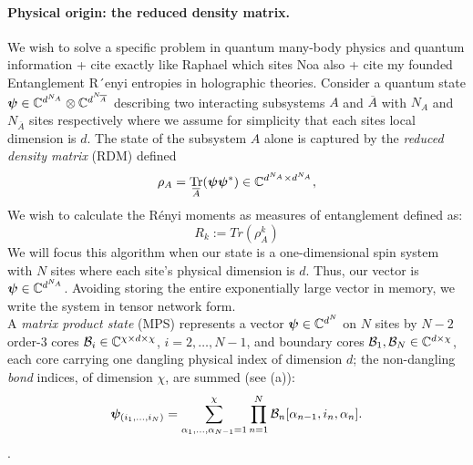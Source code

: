 \documentclass[11pt]{article}
\theoremstyle{plain}
\theoremstyle{definition}
\theoremstyle{remark}
\begin{document}
\paragraph{Physical origin: the reduced density matrix.}
We wish to solve a specific problem in quantum many-body physics and quantum information \cite{vidal2003,schollwock2011,oseledets2011tt}  {\color{red} + cite exactly like Raphael which sites Noa also + cite my founded Entanglement R´enyi entropies in holographic theories.}
Consider a quantum state $\mathbf{\boldsymbol{\psi}}\in\mathbb{C}^{d^{N_A}}\otimes\mathbb{C}^{d^{N_{\overline{A}}}}$ describing
two interacting subsystems $A$  and $\overline{A}$ with $N_A$  and $N_{\overline{A}}$  sites respectively where we assume for simplicity that each sites local dimension is $d$. 
The state of the subsystem $A$ alone is captured by the \emph{reduced density matrix} (RDM) defined
\[
  \rho_A=\mathop{\mathrm{Tr}}_{\overline{A}}(\mathbf{\boldsymbol{\psi}}\mathbf{\boldsymbol{\psi}}^{*})\in\mathbb{C}^{d^{N_A}\times d^{N_A}},
\]
We wish to calculate the R\'enyi moments as measures of entanglement defined as:
\begin{equation}
    R_k:=Tr(\rho_A^k)
\end{equation}
We will focus this algorithm when our state is a one-dimensional spin system with $N$  sites where each site's physical dimension is $d$. Thus, our vector is $\mathbf{\boldsymbol{\psi}}\in\mathbb{C}^{d^{N_A}}$. Avoiding storing the entire exponentially large vector in memory, we  write the system in tensor network form.
\\
A \emph{matrix product state} (MPS) represents a vector
$\mathbf{\boldsymbol{\psi}}\in\mathbb{C}^{d^{N}}$ on $N$ sites by $N-2$ order-$3$ cores
$\mathcal{B}_{i}\in\mathbb{C}^{\chi\times d\times\chi}$, $i=2,\dots,N-1$, and boundary
cores $\mathcal{B}_{1},\mathcal{B}_{N}\in\mathbb{C}^{d\times\chi}$, each core carrying one
dangling  physical index of dimension $d$; the non-dangling
\emph{bond} indices, of dimension $\chi$, are summed (see (a)):
\begin{equation}\label{eq:mps-def}
  \mathbf{\boldsymbol{\psi}}_{(i_1,\dots,i_N)}
  =\sum_{\alpha_1,\dots,\alpha_{N-1}=1}^{\chi}
   \prod_{n=1}^{N}\mathcal{B}_{n}[\alpha_{n-1},i_n,\alpha_n].
\end{equation}.
\end{document}

